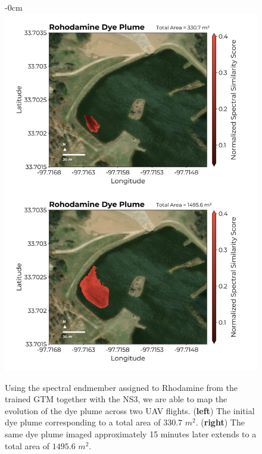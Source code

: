 \documentclass[remotesensing,article,submit,pdftex,moreauthors]{Definitions/mdpi}
\begin{document}
\newpage 

\begin{figure}
\begin{adjustwidth}{-\extralength}{0cm}
\centering
\includegraphics[width=14.5cm]{paper/figures/results/rhodamine-vertical.png}
\end{adjustwidth}
\caption{Using the spectral endmember assigned to Rhodamine from the trained GTM together with the NS3, we are able to map the evolution of the dye plume across two UAV flights. (\textbf{left}) The initial dye plume corresponding to a total area of $330.7$ $m^2$. (\textbf{right}) The same dye plume imaged approximately 15 minutes later extends to a total area of $1495.6$ $m^2$.\label{fig:rhodamine-map}}
\end{figure}  

\newpage
\end{document}
